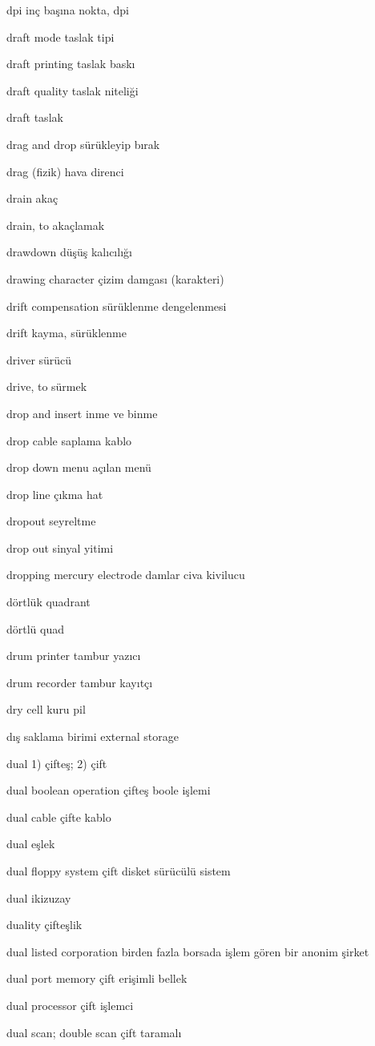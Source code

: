 \documentclass[12pt,fleqn]{article}\usepackage{../../common}
\begin{document}
dpi inç başına nokta, dpi

draft mode taslak tipi

draft printing taslak baskı

draft quality taslak niteliği

draft taslak

drag and drop sürükleyip bırak

drag (fizik) hava direnci 

drain akaç

drain, to akaçlamak

drawdown düşüş kalıcılığı

drawing character çizim damgası (karakteri)

drift compensation sürüklenme dengelenmesi

drift kayma, sürüklenme

driver sürücü

drive, to sürmek

drop and insert inme ve binme

drop cable saplama kablo

drop down menu açılan menü

drop line çıkma hat

dropout seyreltme

drop out sinyal yitimi

dropping mercury electrode damlar civa kivilucu

dörtlük quadrant

dörtlü quad

drum printer tambur yazıcı

drum recorder tambur kayıtçı

dry cell kuru pil

dış saklama birimi external storage

dual 1) çifteş; 2) çift

dual boolean operation çifteş boole işlemi

dual cable çifte kablo

dual eşlek

dual floppy system çift disket sürücülü sistem

dual ikizuzay

duality çifteşlik

dual listed corporation birden fazla borsada işlem gören bir anonim şirket

dual port memory çift erişimli bellek

dual processor çift işlemci

dual scan; double scan çift taramalı
\end{document}
